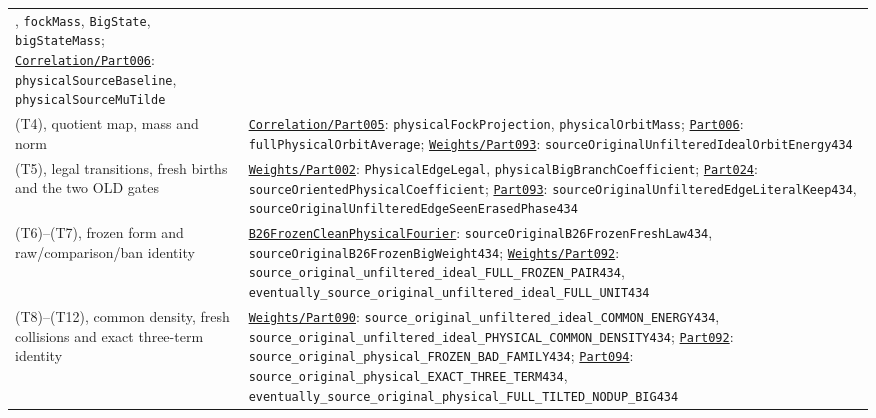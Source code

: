 \begin{longtable}[]{@{}
  >{\raggedright\arraybackslash}p{}
  >{\raggedright\arraybackslash}p{}@{}}
{\small\nolinkurl{FockState}}, {\small\nolinkurl{fockMass}},
{\small\nolinkurl{BigState}}, {\small\nolinkurl{bigStateMass}};
\href{../Green64/Library/Correlation/Part006.lean}{\nolinkurl{Correlation/Part006}}:
{\small\nolinkurl{physicalSourceBaseline}},
{\small\nolinkurl{physicalSourceMuTilde}} \\
(T4), quotient map, mass and norm &
\href{../Green64/Library/Correlation/Part005.lean}{\nolinkurl{Correlation/Part005}}:
{\small\nolinkurl{physicalFockProjection}},
{\small\nolinkurl{physicalOrbitMass}};
\href{../Green64/Library/Correlation/Part006.lean}{\nolinkurl{Part006}}:
{\small\nolinkurl{fullPhysicalOrbitAverage}};
\href{../Green64/Library/Weights/Part093.lean}{\nolinkurl{Weights/Part093}}:
{\small\nolinkurl{sourceOriginalUnfilteredIdealOrbitEnergy434}} \\
(T5), legal transitions, fresh births and the two OLD gates &
\href{../Green64/Library/Weights/Part002.lean}{\nolinkurl{Weights/Part002}}:
{\small\nolinkurl{PhysicalEdgeLegal}},
{\small\nolinkurl{physicalBigBranchCoefficient}};
\href{../Green64/Library/Weights/Part024.lean}{\nolinkurl{Part024}}:
{\small\nolinkurl{sourceOrientedPhysicalCoefficient}};
\href{../Green64/Library/Weights/Part093.lean}{\nolinkurl{Part093}}:
{\small\nolinkurl{sourceOriginalUnfilteredEdgeLiteralKeep434}},
{\small\nolinkurl{sourceOriginalUnfilteredEdgeSeenErasedPhase434}} \\
(T6)--(T7), frozen form and raw/comparison/ban identity &
\href{../Green64/Library/Correlation/B26FrozenCleanPhysicalFourier.lean}{\nolinkurl{B26FrozenCleanPhysicalFourier}}:
{\small\nolinkurl{sourceOriginalB26FrozenFreshLaw434}},
{\small\nolinkurl{sourceOriginalB26FrozenBigWeight434}};
\href{../Green64/Library/Weights/Part092.lean}{\nolinkurl{Weights/Part092}}:
{\small\nolinkurl{source_original_unfiltered_ideal_FULL_FROZEN_PAIR434}},
{\small\nolinkurl{eventually_source_original_unfiltered_ideal_FULL_UNIT434}} \\
(T8)--(T12), common density, fresh collisions and exact three-term
identity &
\href{../Green64/Library/Weights/Part090.lean}{\nolinkurl{Weights/Part090}}:
{\small\nolinkurl{source_original_unfiltered_ideal_COMMON_ENERGY434}},
{\small\nolinkurl{source_original_unfiltered_ideal_PHYSICAL_COMMON_DENSITY434}};
\href{../Green64/Library/Weights/Part092.lean}{\nolinkurl{Part092}}:
{\small\nolinkurl{source_original_physical_FROZEN_BAD_FAMILY434}};
\href{../Green64/Library/Weights/Part094.lean}{\nolinkurl{Part094}}:
{\small\nolinkurl{source_original_physical_EXACT_THREE_TERM434}},
{\small\nolinkurl{eventually_source_original_physical_FULL_TILTED_NODUP_BIG434}} \\

\end{longtable}
